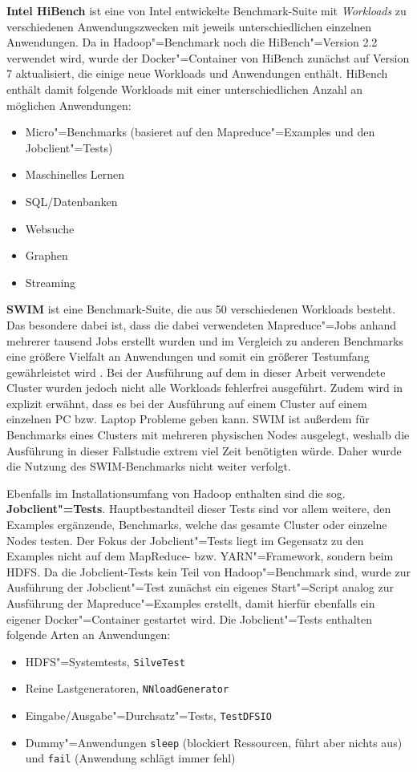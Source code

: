 \textbf{Intel HiBench} ist eine von Intel entwickelte Benchmark-Suite mit \emph{Workloads} zu verschiedenen Anwendungszwecken mit jeweils unterschiedlichen einzelnen Anwendungen. Da in Hadoop"=Benchmark noch die HiBench"=Version \mbox{2.2} verwendet wird, wurde der Docker"=Container von HiBench zunächst auf Version 7 aktualisiert, die einige neue Workloads und Anwendungen enthält. HiBench enthält damit folgende Workloads mit einer unterschiedlichen Anzahl an möglichen Anwendungen:

\begin{itemize}
    \item Micro"=Benchmarks (basieret auf den Mapreduce"=Examples und den Jobclient"=Tests)
    \item Maschinelles Lernen
    \item SQL/Datenbanken
    \item Websuche
    \item Graphen
    \item Streaming
\end{itemize}

\textbf{\ac{SWIM}} ist eine Benchmark-Suite, die aus 50 verschiedenen Workloads besteht. Das besondere dabei ist, dass die dabei verwendeten Mapreduce"=Jobs anhand mehrerer tausend Jobs erstellt wurden und im Vergleich zu anderen Benchmarks eine größere Vielfalt an Anwendungen und somit ein größerer Testumfang gewährleistet wird \cite{SwimWikiHome}. Bei der Ausführung auf dem in dieser Arbeit verwendete Cluster wurden jedoch nicht alle Workloads fehlerfrei ausgeführt. Zudem wird in \cite{InriaTutorial} explizit erwähnt, dass es bei der Ausführung auf einem Cluster auf einem einzelnen PC bzw. Laptop Probleme geben kann. SWIM ist außerdem für Benchmarks eines Clusters mit mehreren physischen Nodes ausgelegt, weshalb die Ausführung in dieser Fallstudie extrem viel Zeit benötigten würde. Daher wurde die Nutzung des SWIM-Benchmarks nicht weiter verfolgt.

Ebenfalls im Installationsumfang von Hadoop enthalten sind die sog. \textbf{Jobclient"=Tests}. Hauptbestandteil dieser Tests sind vor allem weitere, den Examples ergänzende, Benchmarks, welche das gesamte Cluster oder einzelne Nodes testen. Der Fokus der Jobclient"=Tests liegt im Gegensatz zu den Examples nicht auf dem MapReduce- bzw. YARN"=Framework, sondern beim \ac{HDFS}. Da die Jobclient-Tests kein Teil von Hadoop"=Benchmark sind, wurde zur Ausführung der Jobclient"=Test zunächst ein eigenes Start"=Script analog zur Ausführung der Mapreduce"=Examples erstellt, damit hierfür ebenfalls ein eigener Docker"=Container gestartet wird. Die Jobclient"=Tests enthalten \uA folgende Arten an Anwendungen:

\begin{itemize}
    \item \ac{HDFS}"=Systemtests, \zB \texttt{SilveTest}
    \item Reine Lastgeneratoren, \zB \texttt{NNloadGenerator}
    \item Eingabe/Ausgabe"=Durchsatz"=Tests, \zB \texttt{TestDFSIO}
    \item Dummy"=Anwendungen \texttt{sleep} (blockiert Ressourcen, führt aber nichts aus) und \texttt{fail} (Anwendung schlägt immer fehl)
\end{itemize}
